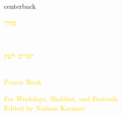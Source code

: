 \documentclass[
coverheight=8.5in,
coverwidth=5.5in,
spinewidth=.781in,
bleedwidth=.125in,
marklength=0in,
12pt,
pagecolor=black,
]{bookcover}
\newcommand{\hebtext}[1]{
\begin{hebrew}
	#1
\end{hebrew}
}
\begin{document}
\begin{bookcover}

	\begin{bookcoverelement}{center}{back}
		\begin{Huge}
			\textcolor{gold}{\hebtext{ סדור }}\\
			\textcolor{gold}{\hebtext{ישרים לשון}}\\
			\textcolor{gold}{Prayer Book}
				
		\end{Huge}
		\vspace{2\baselineskip}
		\begin{large}
			\textcolor{gold}{For Weekdays, Shabbat, and Festivals\\Edited by Nathan Kasimer}
		\end{large}
	\end{bookcoverelement}
	\end{bookcover}
	
\end{document}
